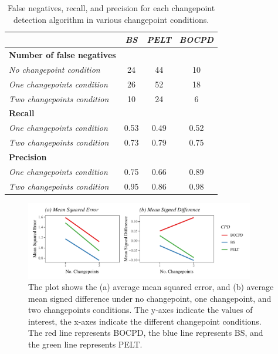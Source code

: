 \documentclass[]{interact}
\theoremstyle{plain}%
\theoremstyle{definition}
\theoremstyle{remark}
\begin{document}
	\begin{table}[H]
		\centering
		\renewcommand{\arraystretch}{1.2} %
		\small
		\caption{False negatives, recall, and precision for each changepoint detection algorithm in various changepoint conditions.}
		\begin{tabular}{lccc}
			\hline
			& \textit{BS} & \textit{PELT} & \textit{BOCPD} \\ \hline
			\textbf{Number of false negatives} &             &               &                \\
			\textit{No changepoint condition}   & 24          & 44            & 10             \\
			\textit{One changepoints condition} & 26          & 52            & 18             \\
			\textit{Two changepoints condition} & 10          & 24            & 6              \\
			\textbf{Recall}                    &             &               &                \\
			\textit{One changepoints condition} & 0.53        & 0.49          & 0.52           \\
			\textit{Two changepoints condition} & 0.73        & 0.79          & 0.75           \\
			\textbf{Precision}                 &             &               &                \\
			\textit{One changepoints condition} & 0.75        & 0.66          & 0.89           \\
			\textit{Two changepoints condition} & 0.95        & 0.86          & 0.98           \\ \hline
		\end{tabular}
	\label{FN_TPR_PPV}
	\end{table}

    \begin{figure}[H]
    	\captionsetup{justification=raggedright}
    	\renewcommand{\figurename}{Figure}
    	\centering
    	\includegraphics[width=10cm]{MSEMSD}
    	\caption{\fontsize{8}{10}\selectfont The plot shows the (a) average mean squared error, and (b) average mean signed difference under no changepoint, one changepoint, and two changepoints conditions. The y-axes indicate the values of interest, the x-axes indicate the different changepoint conditions. The red line represents BOCPD, the blue line represents BS, and the green line represents PELT.}
    	\label{Figure 4}
    \end{figure}
\end{document}
